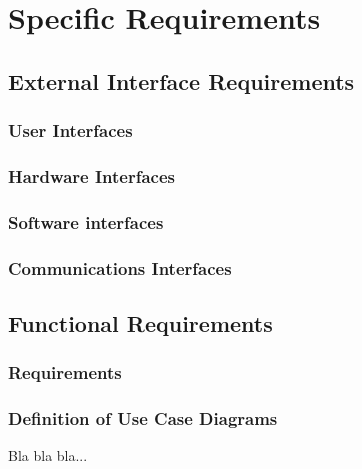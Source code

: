 \chapter{Specific Requirements}

\section{External Interface Requirements}

\subsection{User Interfaces}
\subsection{Hardware Interfaces}
\subsection{Software interfaces}
\subsection{Communications Interfaces}

\section{Functional Requirements}

\subsection{Requirements}

\subsection{Definition of Use Case Diagrams}

Bla bla bla...

